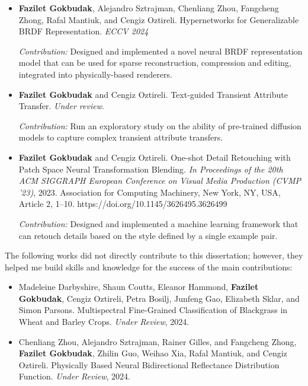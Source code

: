 \begin{itemize}

\item \textbf{Fazilet Gokbudak}, Alejandro Sztrajman, Chenliang Zhou,  Fangcheng Zhong, Rafal Mantiuk, and Cengiz Oztireli. Hypernetworks for Generalizable BRDF Representation. \textit{ECCV 2024}

\textit{Contribution:} Designed and implemented a novel neural BRDF representation model that can be used for sparse reconstruction, compression and editing, integrated into physically-based renderers.

\item \textbf{Fazilet Gokbudak} and Cengiz Oztireli. Text-guided Transient Attribute Transfer. \textit{Under review}.

\textit{Contribution:} Run an exploratory study on the ability of pre-trained diffusion models to capture complex transient attribute transfers.

\item \textbf{Fazilet Gokbudak} and Cengiz Oztireli. One-shot Detail Retouching with Patch Space Neural Transformation Blending. \textit{In Proceedings of the 20th ACM SIGGRAPH European Conference on Visual Media Production (CVMP '23)}, 2023. Association for Computing Machinery, New York, NY, USA, Article 2, 1–10. https://doi.org/10.1145/3626495.3626499

\textit{Contribution:} Designed and implemented a machine learning framework that can retouch details based on the style defined by a single example pair. 

\end{itemize}

The following works did not directly contribute to this dissertation; however, they helped me build skills and knowledge for the success of the main contributions:

\begin{itemize}

\item Madeleine Darbyshire, Shaun Coutts, Eleanor Hammond, \textbf{Fazilet Gokbudak}, Cengiz Oztireli, Petra Bosilj, Junfeng Gao, Elizabeth Sklar, and Simon Parsons. Multispectral Fine-Grained Classification of Blackgrass in Wheat and Barley Crops. \textit{Under Review}, 2024.

\item Chenliang Zhou, Alejandro Sztrajman, Rainer Gilles, and Fangcheng Zhong, \textbf{Fazilet Gokbudak}, Zhilin Guo, Weihao Xia, Rafal Mantiuk, and Cengiz Oztireli. Physically Based Neural Bidirectional Reflectance Distribution Function. \textit{Under Review}, 2024.

\end{itemize}